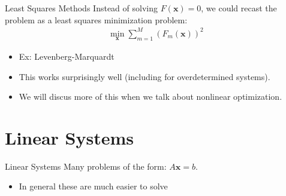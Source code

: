 \documentclass[xcolor=pdftex,dvipsnames,table,mathserif,aspectratio=169]{beamer}
\begin{document}
\begin{frame}{Least Squares Methods}
Instead of solving $F(\mathbf{x})=0$, we could recast the problem as a least squares minimization problem:
\begin{align*}
\min_{\mathbf{x}} \sum_{m=1}^M \left( F_m(\mathbf{x}) \right) ^2
\end{align*}
\begin{itemize}
\item Ex: \alert{Levenberg-Marquardt}
\item This works surprisingly well (including for overdetermined systems).
\item We will discus more of this when we talk about \alert{nonlinear optimization}.
\end{itemize}
\end{frame} 



\section{Linear Systems}
\begin{frame}{Linear Systems}
Many problems of the form: $A \mathbf{x} = b$.
\begin{itemize}
\item In general these are much easier to solve
\end{itemize}

\end{frame}
\end{document}
